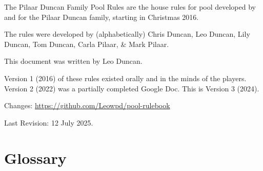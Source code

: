 \documentclass[a4paper, twocolumn]{article}
\newcommand{\currentversion}{3}
\newcommand{\currentversiondate}{12 July 2025}
\begin{document}
\setlength{\parindent}{0pt}

The Pilaar Duncan Family Pool Rules are the house rules for pool developed by and for the Pilaar Duncan family, starting in Christmas 2016.
\vspace{1em}

The rules were developed by (alphabetically) Chris Duncan, Leo Duncan, Lily Duncan, Tom Duncan, Carla Pilaar, \& Mark Pilaar.
\vspace{1em}

This document was written by Leo Duncan.
\vspace{1em}

Version 1 (2016) of these rules existed orally and in the minds of the players. Version 2 (2022) was a partially completed Google Doc. This is Version 3 (2024).
\vspace{1em}


Changes: {\small \url{https://github.com/Leowpd/pool-rulebook}}
\vspace{1em}

Last Revision: \currentversiondate.

\newpage

\section{Glossary} \label{glossary}
\end{document}
